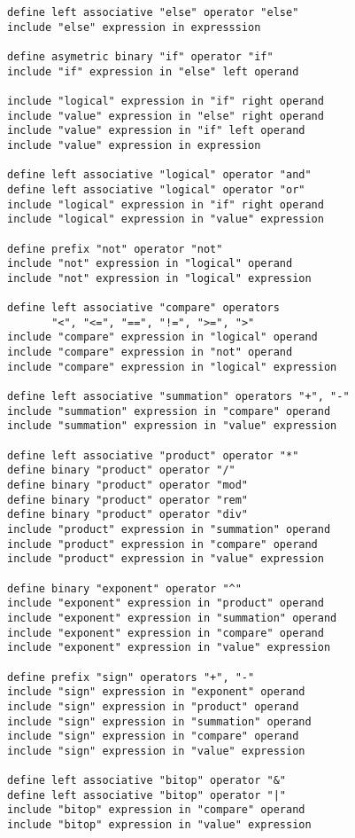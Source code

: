 \documentclass[12pt]{article}
\newenvironment{indpar}[1][0.3in]%
	{\begin{list}{}%
		     {\setlength{\itemsep}{0in}%
		      \setlength{\topsep}{0in}%
		      \setlength{\parsep}{1ex}%
		      \setlength{\labelwidth}{#1}%
		      \setlength{\leftmargin}{#1}%
		      \addtolength{\leftmargin}{\labelsep}}%
	 \item}%
	{\end{list}}
\begin{document}
\begin{indpar}\begin{verbatim}
define left associative "else" operator "else"
include "else" expression in expresssion

define asymetric binary "if" operator "if"
include "if" expression in "else" left operand

include "logical" expression in "if" right operand
include "value" expression in "else" right operand
include "value" expression in "if" left operand
include "value" expression in expression

define left associative "logical" operator "and"
define left associative "logical" operator "or"
include "logical" expression in "if" right operand
include "logical" expression in "value" expression

define prefix "not" operator "not"
include "not" expression in "logical" operand
include "not" expression in "logical" expression

define left associative "compare" operators
       "<", "<=", "==", "!=", ">=", ">"
include "compare" expression in "logical" operand
include "compare" expression in "not" operand
include "compare" expression in "logical" expression

define left associative "summation" operators "+", "-"
include "summation" expression in "compare" operand
include "summation" expression in "value" expression

define left associative "product" operator "*"
define binary "product" operator "/"
define binary "product" operator "mod"
define binary "product" operator "rem"
define binary "product" operator "div"
include "product" expression in "summation" operand
include "product" expression in "compare" operand
include "product" expression in "value" expression

define binary "exponent" operator "^"
include "exponent" expression in "product" operand
include "exponent" expression in "summation" operand
include "exponent" expression in "compare" operand
include "exponent" expression in "value" expression

define prefix "sign" operators "+", "-"
include "sign" expression in "exponent" operand
include "sign" expression in "product" operand
include "sign" expression in "summation" operand
include "sign" expression in "compare" operand
include "sign" expression in "value" expression

define left associative "bitop" operator "&"
define left associative "bitop" operator "|"
include "bitop" expression in "compare" operand
include "bitop" expression in "value" expression


\end{verbatim}
\end{indpar}
\end{document}
